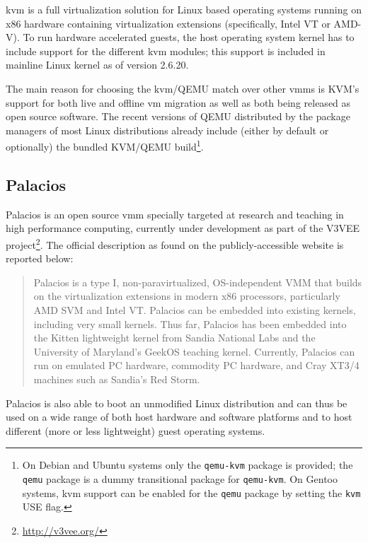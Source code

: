 \gls{kvm} \cite{kvm-www} is a full virtualization solution for Linux based operating systems running on x86 hardware containing virtualization extensions (specifically, Intel VT or AMD-V). To run hardware accelerated guests, the host operating system kernel has to include support for the different \gls{kvm} modules; this support is included in mainline Linux kernel as of version 2.6.20.

The main reason for choosing the \gls{kvm}/QEMU match over other \glspl{vmm} is KVM's support for both live and offline \gls{vm} migration as well as both being released as open source software. The recent versions of QEMU distributed by the package managers of most Linux distributions already include (either by default or optionally) the bundled KVM/QEMU build\footnote{On Debian and Ubuntu systems only the \texttt{qemu-kvm} package is provided; the \texttt{qemu} package is a dummy transitional package for \texttt{qemu-kvm}. On Gentoo systems, \gls{kvm} support can be enabled for the \texttt{qemu} package by setting the \texttt{kvm} USE flag.}.


\subsection*{Palacios}
\label{sec:palacios}

Palacios is an open source \gls{vmm} specially targeted at research and teaching in high performance computing, currently under development as part of the V3VEE project\footnote{\url{http://v3vee.org/}}. The official description as found on the publicly-accessible website \cite{palacios-www} is reported below:

\begin{quote}
Palacios is a type I, non-paravirtualized, OS-independent VMM that builds on the virtualization extensions in modern x86 processors, particularly AMD SVM and Intel VT. Palacios can be embedded into existing kernels, including very small kernels. Thus far, Palacios has been embedded into the Kitten lightweight kernel from Sandia National Labs and the University of Maryland's GeekOS teaching kernel. Currently, Palacios can run on emulated PC hardware, commodity PC hardware, and Cray XT3/4 machines such as Sandia's Red Storm.
\end{quote}

Palacios is also able to boot an unmodified Linux distribution \cite{palacios} and can thus be used on a wide range of both host hardware and software platforms and to host different (more or less lightweight) guest operating systems.


